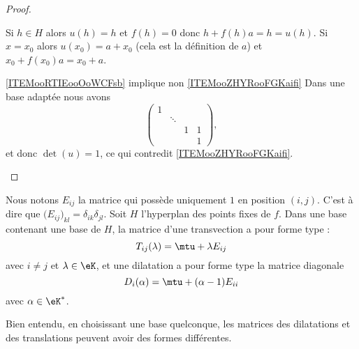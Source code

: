 \begin{proof}
\begin{subproof}
            Si \( h\in H\) alors \( u(h)=h\) et \( f(h)=0\) donc \( h+f(h)a=h=u(h)\). Si \( x=x_0\) alors \( u(x_0)=a+x_0\) (cela est la définition de \( a\)) et\( x_0+f(x_0)a=x_0+a\).
        \item[\ref{ITEMooRTIEooOoWCFsb} implique non \ref{ITEMooZHYRooFGKaifi}]
           Dans une base adaptée nous avons 
           \begin{equation}
               \begin{pmatrix}
                    1    &       &       &       \\
                        &   \ddots    &       &       \\
                        &       &   1    &   1    \\ 
                        &       &       &   1     
                \end{pmatrix},
           \end{equation}
           et donc \( \det(u)=1\), ce qui contredit \ref{ITEMooZHYRooFGKaifi}.
    \end{subproof}
\end{proof}

\begin{remark}
    Nous notons \( E_{ij}\) la matrice qui possède uniquement \( 1\) en position \( (i,j)\). C'est à dire que \( \big( E_{ij} \big)_{kl}=\delta_{ik}\delta_{jl}\). Soit \( H\) l'hyperplan des points fixes de \( f\). Dans une base contenant une base de $H$, la matrice d'une transvection a pour forme type :
    \begin{equation}        \label{EqooZAKHooBjKlTd}
        T_{ij}(\lambda)=\mtu+\lambda E_{ij}
    \end{equation}
    avec \( i\neq j\) et \( \lambda\in \eK\), et une dilatation a pour forme type la matrice diagonale
    \begin{equation}
        D_i(\alpha)=\mtu+(\alpha-1)E_{ii}
    \end{equation}
    avec \( \alpha\in \eK^*\).

    Bien entendu, en choisissant une base quelconque, les matrices des dilatations et des translations peuvent avoir des formes différentes.
\end{remark}

